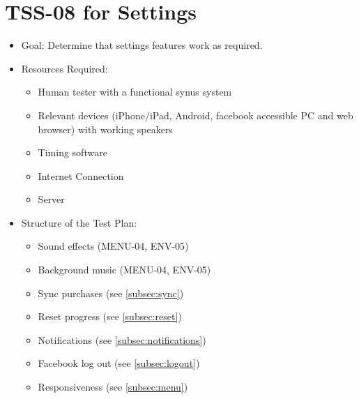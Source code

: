\section{TSS-08 for Settings}
\begin{itemize}
\item Goal: Determine that settings features work as required.

\item Resources Required:
\begin{itemize}
\item Human tester with a functional synus system
\item Relevant devices (iPhone/iPad, Android, facebook accessible PC and web browser) with working speakers
\item Timing software
\item Internet Connection 
\item Server
\end{itemize}

\item Structure of the Test Plan: 
\begin{itemize}
\item Sound effects (MENU-04, ENV-05)
\item Background music (MENU-04, ENV-05)
\item Sync purchases (see \ref{subsec:sync})
\item Reset progress (see \ref{subsec:reset})
\item Notifications (see \ref{subsec:notifications})
\item Facebook log out (see \ref{subsec:logout})
\item Responsiveness (see \ref{subsec:menu})
\end{itemize}
\end{itemize}

